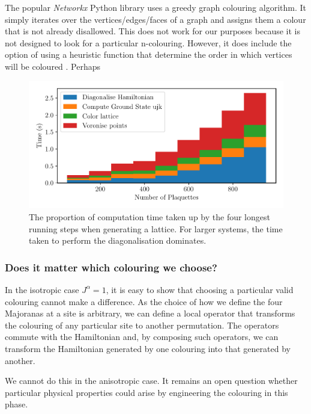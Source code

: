 The popular \emph{Networkx} Python library uses a greedy graph colouring algorithm. It simply iterates over the vertices/edges/faces of a graph and assigns them a colour that is not already disallowed. This does not work for our purposes because it is not designed to look for a particular n-colouring. However, it does include the option of using a heuristic function that determine the order in which vertices will be coloured \autocite{kosowski2004classical,matulaSmallestlastOrderingClustering1983}. Perhaps

\begin{figure}
\hypertarget{fig:times}{%
\centering
\includegraphics[width=1\textwidth,height=\textheight]{figure_code/amk_chapter/methods/times/times.pdf}
\caption{The proportion of computation time taken up by the four longest running steps when generating a lattice. For larger systems, the time taken to perform the diagonalisation dominates.}\label{fig:times}
}
\end{figure}

\hypertarget{does-it-matter-which-colouring-we-choose}{%
\subsubsection{Does it matter which colouring we choose?}\label{does-it-matter-which-colouring-we-choose}}

In the isotropic case \(J^\alpha = 1\), it is easy to show that choosing a particular valid colouring cannot make a difference. As the choice of how we define the four Majoranas at a site is arbitrary, we can define a local operator that transforms the colouring of any particular site to another permutation. The operators commute with the Hamiltonian and, by composing such operators, we can transform the Hamiltonian generated by one colouring into that generated by another.

We cannot do this in the anisotropic case. It remains an open question whether particular physical properties could arise by engineering the colouring in this phase.

